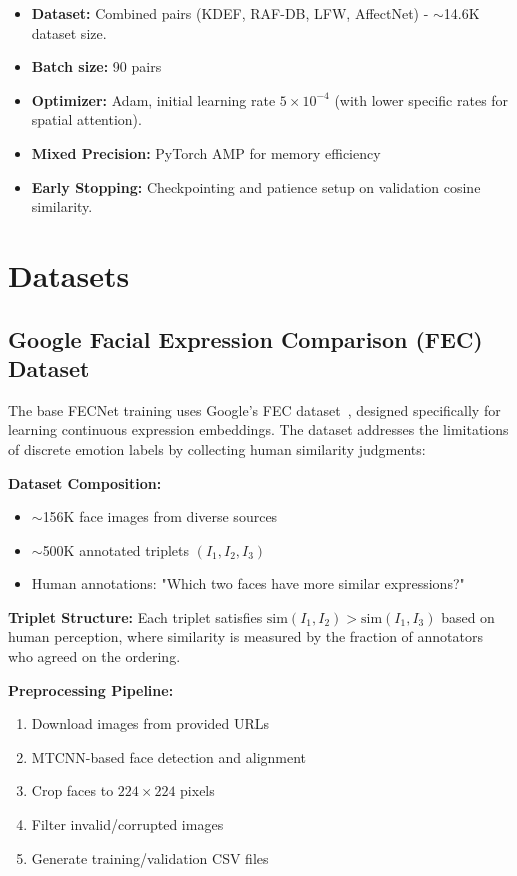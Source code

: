 \documentclass[10pt,twocolumn]{article}
\begin{document}
\begin{itemize}
    \item \textbf{Dataset:} Combined pairs (KDEF, RAF-DB, LFW, AffectNet) - $\sim$14.6K dataset size.
    \item \textbf{Batch size:} 90 pairs
    \item \textbf{Optimizer:} Adam, initial learning rate $5 \times 10^{-4}$ (with lower specific rates for spatial attention).
    \item \textbf{Mixed Precision:} PyTorch AMP for memory efficiency
    \item \textbf{Early Stopping:} Checkpointing and patience setup on validation cosine similarity.
\end{itemize}



\section{Datasets}

\subsection{Google Facial Expression Comparison (FEC) Dataset}
The base FECNet training uses Google's FEC dataset~\cite{vemulapalli2019compact}, designed specifically for learning continuous expression embeddings. The dataset addresses the limitations of discrete emotion labels by collecting human similarity judgments:

\textbf{Dataset Composition:}
\begin{itemize}
    \item $\sim$156K face images from diverse sources
    \item $\sim$500K annotated triplets $(I_1, I_2, I_3)$
    \item Human annotations: "Which two faces have more similar expressions?"
\end{itemize}

\textbf{Triplet Structure:} Each triplet satisfies $\text{sim}(I_1, I_2) > \text{sim}(I_1, I_3)$ based on human perception, where similarity is measured by the fraction of annotators who agreed on the ordering.

\textbf{Preprocessing Pipeline:}
\begin{enumerate}
    \item Download images from provided URLs
    \item MTCNN-based face detection and alignment
    \item Crop faces to $224 \times 224$ pixels
    \item Filter invalid/corrupted images
    \item Generate training/validation CSV files
\end{enumerate}
\end{document}

